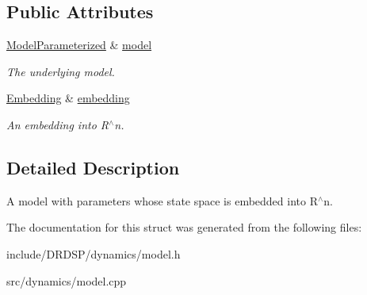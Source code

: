 \subsection*{Public Attributes}
\begin{DoxyCompactItemize}
\item 
\hypertarget{struct_d_r_d_s_p_1_1_model_parameterized_embedded_ad28b3f0f264467c90fdf0577247b78c9}{\hyperlink{struct_d_r_d_s_p_1_1_model_parameterized}{Model\-Parameterized} \& \hyperlink{struct_d_r_d_s_p_1_1_model_parameterized_embedded_ad28b3f0f264467c90fdf0577247b78c9}{model}}\label{struct_d_r_d_s_p_1_1_model_parameterized_embedded_ad28b3f0f264467c90fdf0577247b78c9}

\begin{DoxyCompactList}\small\item\em The underlying model. \end{DoxyCompactList}\item 
\hypertarget{struct_d_r_d_s_p_1_1_model_parameterized_embedded_acb6dafec5e47012779a1b7fcbee6227d}{\hyperlink{struct_d_r_d_s_p_1_1_embedding}{Embedding} \& \hyperlink{struct_d_r_d_s_p_1_1_model_parameterized_embedded_acb6dafec5e47012779a1b7fcbee6227d}{embedding}}\label{struct_d_r_d_s_p_1_1_model_parameterized_embedded_acb6dafec5e47012779a1b7fcbee6227d}

\begin{DoxyCompactList}\small\item\em An embedding into R$^\wedge$n. \end{DoxyCompactList}\end{DoxyCompactItemize}


\subsection{Detailed Description}
A model with parameters whose state space is embedded into R$^\wedge$n. 

The documentation for this struct was generated from the following files\-:\begin{DoxyCompactItemize}
\item 
include/\-D\-R\-D\-S\-P/dynamics/model.\-h\item 
src/dynamics/model.\-cpp\end{DoxyCompactItemize}
